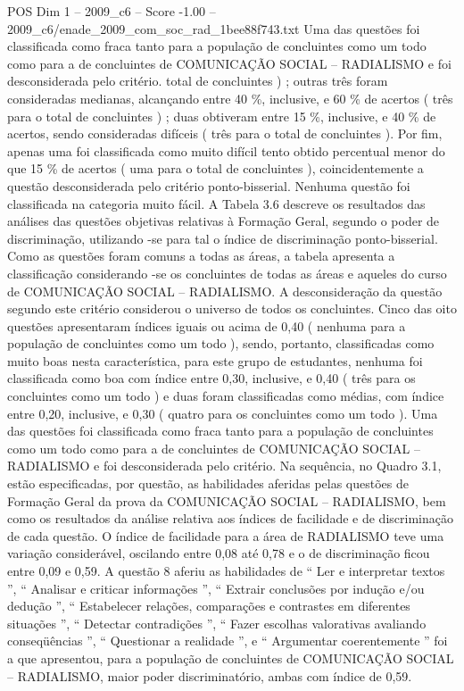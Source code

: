 \begin{textsample}{POS Dim 1 – 2009\_c6 – Score -1.00 – 2009\_c6/enade\_2009\_com\_soc\_rad\_1bee88f743.txt}
Uma das questões foi classificada como fraca tanto para a população de concluintes como um todo como para a de concluintes de COMUNICAÇÃO SOCIAL – RADIALISMO e foi desconsiderada pelo critério. total de concluintes ) ; outras três foram consideradas medianas, alcançando entre 40 \%, inclusive, e 60 \% de acertos ( três para o total de concluintes ) ; duas obtiveram entre 15 \%, inclusive, e 40 \% de acertos, sendo consideradas difíceis ( três para o total de concluintes ).
Por fim, apenas uma foi classificada como muito difícil tento obtido percentual menor do que 15 \% de acertos ( uma para o total de concluintes ), coincidentemente a questão desconsiderada pelo critério ponto-bisserial.
Nenhuma questão foi classificada na categoria muito fácil.
A Tabela 3.6 descreve os resultados das análises das questões objetivas relativas à Formação Geral, segundo o poder de discriminação, utilizando -se para tal o índice de discriminação ponto-bisserial.
Como as questões foram comuns a todas as áreas, a tabela apresenta a classificação considerando -se os concluintes de todas as áreas e aqueles do curso de COMUNICAÇÃO SOCIAL – RADIALISMO.
A desconsideração da questão segundo este critério considerou o universo de todos os concluintes.
Cinco das oito questões apresentaram índices iguais ou acima de 0,40 ( nenhuma para a população de concluintes como um todo ), sendo, portanto, classificadas como muito boas nesta característica, para este grupo de estudantes, nenhuma foi classificada como boa com índice entre 0,30, inclusive, e 0,40 ( três para os concluintes como um todo ) e duas foram classificadas como médias, com índice entre 0,20, inclusive, e 0,30 ( quatro para os concluintes como um todo ).
Uma das questões foi classificada como fraca tanto para a população de concluintes como um todo como para a de concluintes de COMUNICAÇÃO SOCIAL – RADIALISMO e foi desconsiderada pelo critério.
Na sequência, no Quadro 3.1, estão especificadas, por questão, as habilidades aferidas pelas questões de Formação Geral da prova da COMUNICAÇÃO SOCIAL – RADIALISMO, bem como os resultados da análise relativa aos índices de facilidade e de discriminação de cada questão.
O índice de facilidade para a área de RADIALISMO teve uma variação considerável, oscilando entre 0,08 até 0,78 e o de discriminação ficou entre 0,09 e 0,59.
A questão 8 aferiu as habilidades de “ Ler e interpretar textos ”, “ Analisar e criticar informações ”, “ Extrair conclusões por indução e/ou dedução ”, “ Estabelecer relações, comparações e contrastes em diferentes situações ”, “ Detectar contradições ”, “ Fazer escolhas valorativas avaliando conseqüências ”, “ Questionar a realidade ”, e “ Argumentar coerentemente ” foi a que apresentou, para a população de concluintes de COMUNICAÇÃO SOCIAL – RADIALISMO, maior poder discriminatório, ambas com índice de 0,59.

\end{textsample}
